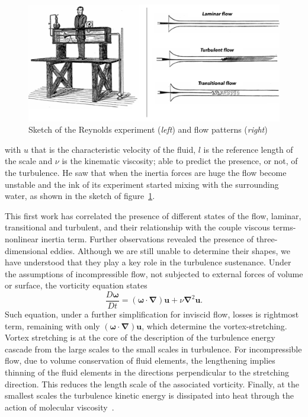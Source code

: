 \begin{figure}
\begin{center}
\includegraphics[width=1\textwidth]{grafici/reynolds_exp}
\caption{Sketch of the Reynolds experiment (\emph{left}) and flow patterns (\emph{right})}
\label{Reynolds:exp}
\end{center}
\end{figure}

with $u$ that is the characteristic velocity of the fluid, $l$ is the reference length of the scale and $\nu$ is the kinematic viscosity; able to predict the presence, or not, of the turbulence. He saw that when the inertia forces are huge the flow become unstable and the ink of its experiment started mixing with the surrounding water, as shown in the sketch of figure~\ref{Reynolds:exp}.
\par
This first work has correlated the presence of different states of the flow, laminar, transitional and turbulent, and their relationship with the couple viscous terms-nonlinear inertia term.
Further observations revealed the presence of three-dimensional eddies. Although we are still unable to determine their shapes, we have understood that they play a key role in the turbulence sustenance. Under the assumptions of incompressible flow, not subjected to external forces of volume or surface, the vorticity equation states
\begin{equation}
\frac{D \boldsymbol{\omega}}{D t} = (\boldsymbol{\omega} \cdot \boldsymbol{\nabla})\boldsymbol{u} + \nu \boldsymbol{\nabla}^{2} \boldsymbol{u}.
\end{equation}
Such equation, under a further simplification for inviscid flow, losses is rightmost term, remaining with only $ (\boldsymbol{\omega} \cdot \boldsymbol{\nabla})\boldsymbol{u}$, which determine the vortex-stretching. 
Vortex stretching is at the core of the description of the turbulence energy cascade from the large scales to the small scales in turbulence.
For incompressible flow, due to volume conservation of fluid elements, the lengthening implies thinning of the fluid elements in the directions perpendicular to the stretching direction. This reduces the length scale of the associated vorticity. Finally, at the smallest scales the turbulence kinetic energy is dissipated into heat through the action of molecular viscosity~\cite{Lumley}.



